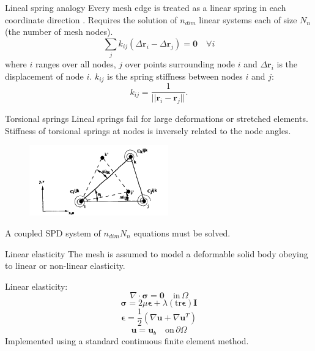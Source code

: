 \documentclass[t,12pt]{beamer}
\let\bld\boldsymbol
\begin{document}
\begin{frame}{Lineal spring analogy}
	Every mesh edge is treated as a linear spring in each coordinate direction . Requires the solution of $n_{dim}$ linear systems each of size $N_n$ (the number of mesh nodes).
	 \begin{equation}
	 \sum_j k_{ij}(\Delta \mathbf{r}_i - \Delta \mathbf{r}_j) = \mathbf{0} \quad \forall i
	 \label{spring}
	 \end{equation}
	 where $i$ ranges over all nodes, $j$ over points surrounding node $i$ and $\Delta \mathbf{r}_i$ is the displacement of node $i$.
	 $k_{ij}$ is the spring stiffness between nodes $i$ and $j$:
	 \begin{equation}
	 k_{ij} = \frac{1}{||\mathbf{r}_i - \mathbf{r}_j||}.
	 \end{equation}
\end{frame}

\begin{frame}{Torsional springs}
Lineal springs fail for large deformations or stretched elements.
Stiffness of torsional springs  at nodes is inversely related to the node angles.
 \begin{figure}
 	\centering
 	\includegraphics[height=1.2in,keepaspectratio]{torsionspring}
 	\label{fig:torsion}
 \end{figure}
 A coupled SPD system of $n_{dim} N_n$ equations must be solved.
\end{frame}

\begin{frame}{Linear elasticity}
  The mesh is assumed to model a deformable solid body obeying to linear or non-linear elasticity.
  
Linear elasticity:
  \begin{equation}
  \nabla \cdot \bld{\sigma}  = \mathbf{0} \quad \text{in} \, \Omega
  \end{equation}
  \begin{equation}
  \bld{\sigma} = 2\mu\bld{\epsilon} + \lambda (\mathrm{tr}\boldsymbol{\epsilon}) \bld{I}
  \label{linelast:constt}
  \end{equation}
  \begin{equation}
  \bld{\epsilon} = \frac12 (\nabla\bld{u}+\nabla\bld{u}^T)
  \label{linelast:strain}
  \end{equation}
  \begin{equation}
  \bld{u} = \bld{u}_b \quad \text{on} \, \partial\Omega
  \end{equation}
  Implemented using a standard continuous finite element method.
\end{frame}
\end{document}
